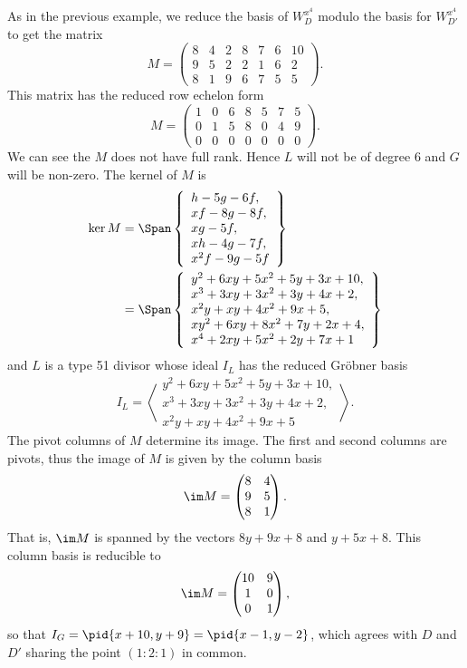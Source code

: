 As in the previous example, we reduce the basis of $W_{D}^{x^4}$ modulo the basis for $W_{D'}^{x^4}$ to get the matrix
\[ M = \begin{pmatrix}
  8 & 4 & 2 & 8 & 7 & 6 & 10 \\
  9 & 5 & 2 & 2 & 1 & 6 & 2 \\
  8 & 1 & 9 & 6 & 7 & 5 & 5
\end{pmatrix}. \]
This matrix has the reduced row echelon form
\[ M = \begin{pmatrix}
  1 & 0 & 6 & 8 & 5 & 7 & 5 \\
  0 & 1 & 5 & 8 & 0 & 4 & 9 \\
  0 & 0 & 0 & 0 & 0 & 0 & 0
\end{pmatrix}. \]
We can see the $M$ does not have full rank.
Hence $L$ will not be of degree 6 and $G$ will be non-zero.
The kernel of $M$ is
\begin{align*}
  \ker M
    &= \Span \left\{ \begin{array}{l}
      h - 5g - 6f, \\
      xf - 8g - 8f, \\
      xg - 5f, \\
      xh - 4g - 7f, \\
      x^2f - 9g - 5f \end{array} \right\} \\
    &= \Span \left\{ \begin{array}{l}
      y^2 + 6xy + 5x^2 + 5y + 3x + 10, \\
      x^3 + 3xy + 3x^2 + 3y + 4x + 2, \\
      x^2y + xy + 4x^2 + 9x + 5, \\
      xy^2 + 6xy + 8x^2 + 7y + 2x + 4, \\
      x^4 + 2xy + 5x^2 + 2y + 7x + 1
    \end{array} \right\}
\end{align*}
and $L$ is a type 51 divisor whose ideal $I_L$ has the reduced Gr\"obner basis
\[ I_L = \left\langle\begin{array}{l}
  y^2 + 6xy + 5x^2 + 5y + 3x + 10, \\ 
  x^3 + 3xy + 3x^2 + 3y + 4x + 2, \\ 
  x^2y + xy + 4x^2 + 9x + 5\end{array}\right\rangle. \]
The pivot columns of $M$ determine its image.
The first and second columns are pivots, thus the image of $M$ is given by the column basis
\[ \im M = \begin{pmatrix}
  8 & 4 \\
  9 & 5 \\
  8 & 1 
\end{pmatrix}. \]
That is, $\im M$ is spanned by the vectors $8y + 9x + 8$ and $y + 5x + 8$.
This column basis is reducible to 
\[ \im M = \begin{pmatrix}
  10 & 9 \\
   1 & 0 \\
   0 & 1 
\end{pmatrix}, \]
so that $I_G = \pid{x + 10, y + 9} = \pid{x - 1, y - 2}$,
which agrees with $D$ and $D'$ sharing the point $(1 : 2 : 1)$ in common.

